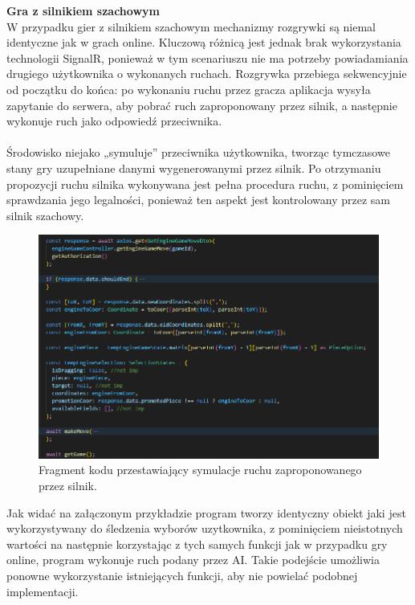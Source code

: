 \documentclass[12pt,a4paper]{article}
\begin{document}
\newpage

\noindent \textbf{Gra z silnikiem szachowym}\\
W przypadku gier z silnikiem szachowym mechanizmy rozgrywki są niemal identyczne jak w grach online. Kluczową różnicą jest jednak brak wykorzystania technologii SignalR, ponieważ w tym scenariuszu nie ma potrzeby powiadamiania drugiego użytkownika o wykonanych ruchach. Rozgrywka przebiega sekwencyjnie od początku do końca: po wykonaniu ruchu przez gracza aplikacja wysyła zapytanie do serwera, aby pobrać ruch zaproponowany przez silnik, a następnie wykonuje ruch jako odpowiedź przeciwnika.
\\\\
Środowisko niejako „symuluje” przeciwnika użytkownika, tworząc tymczasowe stany gry uzupełniane danymi wygenerowanymi przez silnik. Po otrzymaniu propozycji ruchu silnika wykonywana jest pełna procedura ruchu, z pominięciem sprawdzania jego legalności, ponieważ ten aspekt jest kontrolowany przez sam silnik szachowy.

\vspace{1cm}
\begin{figure}[h!]
    \centering
    \includegraphics[width=1\textwidth]{images/ex_engine_move_sim.png}
    \caption{Fragment kodu przestawiający symulacje ruchu zaproponowanego przez silnik.}
\end{figure}

\noindent
Jak widać na załączonym przykładzie program tworzy identyczny obiekt jaki jest wykorzystywany do śledzenia wyborów uzytkownika, z pominięciem nieistotnych wartości na następnie korzystając z tych samych funkcji jak w przypadku gry online, program wykonuje ruch podany przez AI. Takie podejście umożliwia ponowne wykorzystanie istniejących funkcji, aby nie powielać podobnej implementacji.
\end{document}
